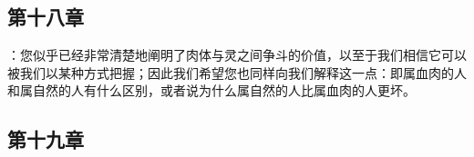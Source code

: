 
\subsection{第十八章}

\par

：您似乎已经非常清楚地阐明了肉体与灵之间争斗的价值，以至于我们相信它可以被我们以某种方式把握；因此我们希望您也同样向我们解释这一点：即属血肉的人和属自然的人有什么区别，或者说为什么属自然的人比属血肉的人更坏。\par


\subsection{第十九章}

\par

